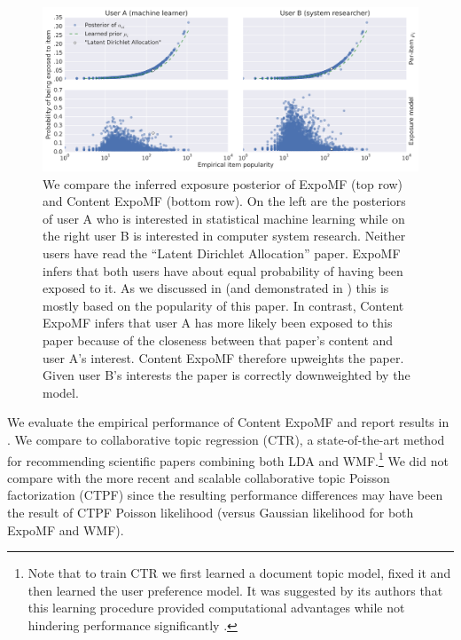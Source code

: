 \begin{figure}
  \centering
    \includegraphics[width=\textwidth]{fig/vanilla_vs_SI}
    \caption{We compare the inferred exposure posterior of ExpoMF (top row)
    and Content ExpoMF (bottom row). On the left are the posteriors of user A
    who is interested in statistical machine learning while on the right
    user B is interested in computer system research. Neither users have
    read the ``Latent Dirichlet Allocation'' paper. ExpoMF
    infers that both users have about equal probability of having been
    exposed to it. As we discussed in  (and demonstrated in ) this is mostly based on the
    popularity of this paper. In contrast, Content ExpoMF infers that
    user A has more likely been exposed to this paper because of the closeness
    between that paper's content and user A's interest. Content ExpoMF
    therefore upweights the paper. Given user B's interests the paper is
    correctly downweighted by the model.}
    \label{fig:si}
\end{figure}

 We evaluate the empirical performance of Content ExpoMF and report results
in . We compare to collaborative topic
regression (CTR), a state-of-the-art method for recommending scientific
papers \cite{wang2011collaborative} combining both LDA and WMF.\footnote{Note that to train CTR
we first learned a document topic model, fixed it and then learned the
user preference model. It was suggested by its authors
that this learning procedure provided computational advantages while not hindering performance significantly \citep{wang2011collaborative}.}
We did not compare with the more recent and scalable collaborative topic
Poisson factorization (CTPF) \cite{gopalan2014content} since the resulting
performance differences may have been the result of CTPF Poisson
likelihood (versus Gaussian likelihood for both ExpoMF and WMF).

